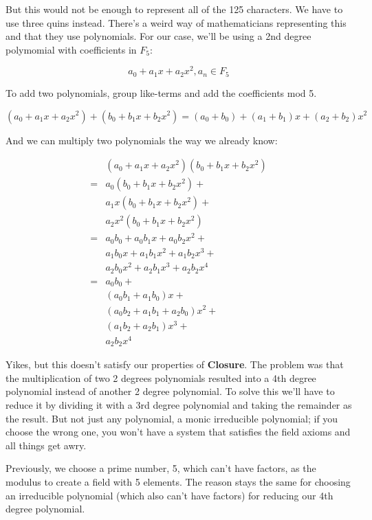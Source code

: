 \documentclass{article}
\begin{document}
But this would not be enough to represent all of the 125
characters. We have to use three quins instead.  There's a weird way of
mathematicians representing this and that they use polynomials. For our case, we'll
be using a 2nd degree polymomial with coefficients
in $F_5$:

\[ a_0 + a_1 x + a_2 x^2, a_n \in F_5 \]

To add two polynomials, group like-terms and add the coefficients mod 5.

\[ (a_0 + a_1 x + a_2 x^2) + (b_0 + b_1 x + b_2 x^2) = (a_0+b_0) + (a_1 + b_1)x + (a_2 + b_2)x^2 \]

And we can multiply two polynomials the way we already know:

\begin{align*}
  & (a_0 + a_1 x + a_2 x^2) (b_0 + b_1 x + b_2 x^2) \\
=& a_0(b_0 + b_1 x + b_2 x^2) + \\
  &  a_1 x(b_0 + b_1 x + b_2 x^2) + \\
   & a_2 x^2(b_0 + b_1 x + b_2 x^2) \\
=& a_0 b_0 + a_0 b_1 x + a_0 b_2 x^2 + \\
  & a_1 b_0 x + a_1 b_1 x^2 + a_1 b_2 x^3 + \\
  & a_2 b_0 x^2 + a_2 b_1 x^3 + a_2 b_2 x^4 \\
=& a_0 b_0 + \\ 
  & (a_0 b_1 + a_1 b_0) x + \\
  & (a_0 b_2 + a_1 b_1 + a_2 b_0)x^2 + \\
  & (a_1 b_2 + a_2 b_1) x^3 + \\
  & a_2 b_2 x^4
\end{align*}

Yikes, but this doesn't satisfy our properties of \textbf{Closure}. The
problem was that the multiplication of two 2 degrees polynomials resulted
into a 4th degree polynomial instead of another 2 degree polynomial. To
solve this we'll have to reduce it by dividing it with a 3rd degree
polynomial and taking the remainder as the result. But not just any
polynomial, a monic irreducible polynomial; if you choose the wrong one,
you won't have a system that satisfies the field axioms and all things
get awry.

Previously, we choose a prime number, 5, which can't have factors, as
the modulus to create a field with 5 elements. The reason stays the same
for choosing an irreducible polynomial (which also can't have factors)
for reducing our 4th degree polynomial.
\end{document}

